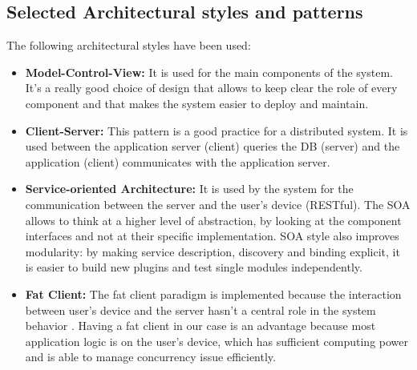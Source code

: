 \clearpage
\subsection{Selected Architectural styles and patterns}
The following architectural styles have been used:
\begin{itemize}
\item
\textbf{Model-Control-View:} It is used for the main components of the system. It’s a really good choice of design that allows to keep clear the role of every component and that makes the system easier to deploy and maintain.
\item
\textbf{Client-Server:} This pattern is a good practice for a distributed system. It is used between the application server (client) queries the DB (server) and the application (client) communicates with the application server.
\item
\textbf{Service-oriented Architecture:} It is used by the system for the communication between the server and the user’s device (RESTful). The SOA allows to think at a higher level of abstraction, by looking at the component interfaces and not at their specific implementation. SOA style also improves modularity: by making service description, discovery and binding explicit, it is easier to build new plugins and test single modules independently.
\item
\textbf{Fat Client:} The fat client paradigm is implemented because the interaction between user’s device and the server hasn’t a central role in the system behavior . Having a fat client in our case is an advantage because most application logic is on the user’s device, which has sufficient computing power and is able to manage concurrency issue efficiently.
\end{itemize}
